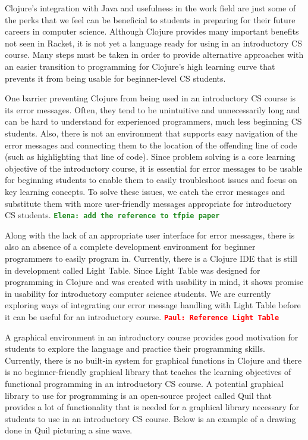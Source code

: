 \documentclass[12pt]{article}
\newcommand{\comment}[1]{{\bf \tt  {#1}}}
\newcommand{\emcomment}[1]{\textcolor{ForestGreen}{\comment{Elena: {#1}}}}
\newcommand{\pscomment}[1]{\textcolor{red}{\comment{Paul: {#1}}}}
\begin{document}
Clojure’s integration with Java and usefulness in the work field are just some of the perks that we feel can be beneficial to students in preparing for their future careers in computer science.  Although Clojure provides many important benefits not seen in Racket, it is not yet a language ready for using in an introductory CS course. Many steps must be taken in order to provide alternative approaches with an easier transition to programming for Clojure's high learning curve that prevents it from being usable for beginner-level CS students.

One barrier preventing Clojure from being used in an introductory CS course is its error messages. Often, they tend to be unintuitive and unnecessarily long and can be hard to understand for experienced programmers, much less beginning CS students. Also, there is not an environment that supports easy navigation of the error messages and connecting them to the location of the offending line of code (such as highlighting that line of code). Since problem solving is a core learning objective of the introductory course, it is essential for error messages to be usable for beginning students to enable them to easily troubleshoot issues and focus on key learning concepts. To solve these issues, we catch the error messages and substitute them with more user-friendly messages appropriate for introductory CS students.
\emcomment{add the reference to tfpie paper}

Along with the lack of an appropriate user interface for error messages, there is also an absence of a complete development environment for beginner programmers to easily program in. %
Currently, there is a Clojure IDE that is still in development called Light Table.  Since Light Table was designed for programming in Clojure and was created with usability in mind, it shows promise in usability for introductory computer science students. We are currently exploring ways of integrating our error message handling with Light Table before it can be useful for an introductory course.
\pscomment{Reference Light Table}

A graphical environment in an introductory course provides good motivation for students to explore the language and practice their programming skills. Currently, there is no built-in system for graphical functions in Clojure and there is no beginner-friendly graphical library that teaches the learning objectives of functional programming in an introductory CS course. A potential graphical library to use for programming is an open-source project called Quil that provides a lot of functionality that is needed for a graphical library necessary for students to use in an introductory CS course. Below is an example of a drawing done in Quil picturing a sine wave.
\end{document}
